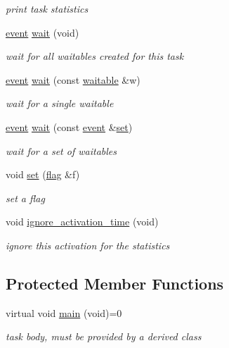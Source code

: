 \begin{DoxyCompactItemize}
\begin{DoxyCompactList}\small\item\em print task statistics \end{DoxyCompactList}\item 
\hyperlink{class_r_t_o_s_1_1event}{event} \hyperlink{class_r_t_o_s_1_1task_a6fc603d0f1c8a94813586d3dfd123fcc}{wait} (void)
\begin{DoxyCompactList}\small\item\em wait for all waitables created for this task \end{DoxyCompactList}\item 
\hyperlink{class_r_t_o_s_1_1event}{event} \hyperlink{class_r_t_o_s_1_1task_a7b20fada91e6d232f6791ebc9675e3fc}{wait} (const \hyperlink{class_r_t_o_s_1_1waitable}{waitable} \&w)
\begin{DoxyCompactList}\small\item\em wait for a single waitable \end{DoxyCompactList}\item 
\hyperlink{class_r_t_o_s_1_1event}{event} \hyperlink{class_r_t_o_s_1_1task_a09111916c62632df3042f5991ac7ab42}{wait} (const \hyperlink{class_r_t_o_s_1_1event}{event} \&\hyperlink{class_r_t_o_s_1_1task_aea8c0cfa2cb431922880cb948ada8854}{set})
\begin{DoxyCompactList}\small\item\em wait for a set of waitables \end{DoxyCompactList}\item 
void \hyperlink{class_r_t_o_s_1_1task_aea8c0cfa2cb431922880cb948ada8854}{set} (\hyperlink{class_r_t_o_s_1_1flag}{flag} \&f)\hypertarget{class_r_t_o_s_1_1task_aea8c0cfa2cb431922880cb948ada8854}{}\label{class_r_t_o_s_1_1task_aea8c0cfa2cb431922880cb948ada8854}

\begin{DoxyCompactList}\small\item\em set a flag \end{DoxyCompactList}\item 
void \hyperlink{class_r_t_o_s_1_1task_a0ea383a40c40d9f69fe8e29fb36fa40d}{ignore\+\_\+activation\+\_\+time} (void)
\begin{DoxyCompactList}\small\item\em ignore this activation for the statistics \end{DoxyCompactList}\end{DoxyCompactItemize}
\subsection*{Protected Member Functions}
\begin{DoxyCompactItemize}
\item 
virtual void \hyperlink{class_r_t_o_s_1_1task_addc6d52f8792ddba1158d7ae5ef0037d}{main} (void)=0
\begin{DoxyCompactList}\small\item\em task body, must be provided by a derived class \end{DoxyCompactList}\end{DoxyCompactItemize}
